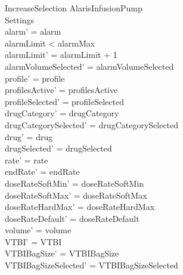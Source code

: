 \begin{schema}{IncreaseSelection}
	\Delta AlarisInfusionPump\\
	 
	Settings\\
	\where
	alarm' = alarm\\
	alarmLimit < alarmMax\\
	alarmLimit' = alarmLimit + 1\\
	alarmVolumeSelected' = alarmVolumeSelected\\
	profile' = profile\\
	\pagebreak
	profilesActive' = profilesActive\\  
	  profileSelected' = profileSelected\\
	drugCategory' = drugCategory\\ drugCategorySelected' = drugCategorySelected\\
	drug' = drug\\ drugSelected' = drugSelected\\
	rate' = rate\\
	endRate' = endRate\\
	doseRateSoftMin' = doseRateSoftMin\\
	doseRateSoftMax' = doseRateSoftMax\\
	doseRateHardMax' = doseRateHardMax\\
	doseRateDefault' = doseRateDefault\\
	volume' = volume\\
	VTBI' = VTBI\\
	VTBIBagSize' = VTBIBagSize\\ VTBIBagSizeSelected' = VTBIBagSizeSelected\\

\end{schema}
